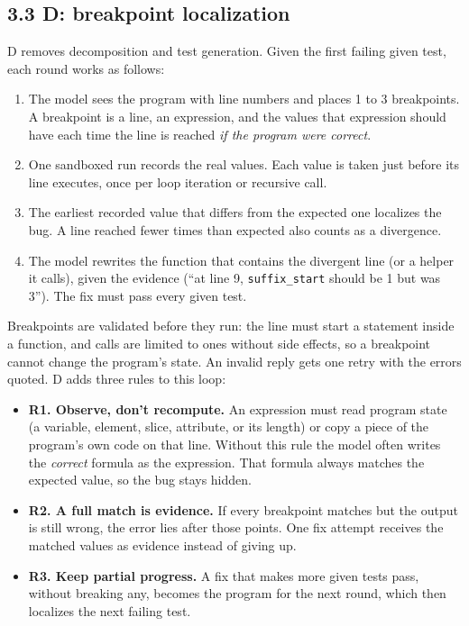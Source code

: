 \documentclass[
  10pt,
  twocolumn]{article}
\providecommand{\tightlist}{%
  \setlength{\itemsep}{0pt}\setlength{\parskip}{0pt}}
\begin{document}
\hypertarget{d-breakpoint-localization}{%
\subsection{3.3 D: breakpoint
localization}\label{d-breakpoint-localization}}

D removes decomposition and test generation. Given the first failing
given test, each round works as follows:

\begin{enumerate}
\def\labelenumi{\arabic{enumi}.}
\tightlist
\item
  The model sees the program with line numbers and places 1 to 3
  breakpoints. A breakpoint is a line, an expression, and the values
  that expression should have each time the line is reached \emph{if the
  program were correct}.
\item
  One sandboxed run records the real values. Each value is taken just
  before its line executes, once per loop iteration or recursive call.
\item
  The earliest recorded value that differs from the expected one
  localizes the bug. A line reached fewer times than expected also
  counts as a divergence.
\item
  The model rewrites the function that contains the divergent line (or a
  helper it calls), given the evidence (``at line 9,
  \texttt{suffix\_start} should be 1 but was 3''). The fix must pass
  every given test.
\end{enumerate}

Breakpoints are validated before they run: the line must start a
statement inside a function, and calls are limited to ones without side
effects, so a breakpoint cannot change the program's state. An invalid
reply gets one retry with the errors quoted. D adds three rules to this
loop:

\begin{itemize}
\tightlist
\item
  \textbf{R1. Observe, don't recompute.} An expression must read program
  state (a variable, element, slice, attribute, or its length) or copy a
  piece of the program's own code on that line. Without this rule the
  model often writes the \emph{correct} formula as the expression. That
  formula always matches the expected value, so the bug stays hidden.
\item
  \textbf{R2. A full match is evidence.} If every breakpoint matches but
  the output is still wrong, the error lies after those points. One fix
  attempt receives the matched values as evidence instead of giving up.
\item
  \textbf{R3. Keep partial progress.} A fix that makes more given tests
  pass, without breaking any, becomes the program for the next round,
  which then localizes the next failing test.
\end{itemize}
\end{document}
